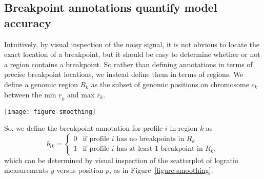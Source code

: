 \documentclass{bioinfo}
\newcommand{\model}[1]{#1}
\newcommand{\NN}{\mathbb N}
\begin{document}
\begin{methods}
\subsection{Breakpoint annotations quantify model accuracy}

Intuitively, by visual inspection of the noisy signal, it is not
obvious to locate the exact location of a breakpoint, but it should be
easy to determine whether or not a region contains a breakpoint.
So rather than defining annotations in terms of precise breakpoint
locations, we instead define them in terms of regions. We define a
genomic region $R_k$ as
the subset of genomic positions on chromosome $c_k$ between the min
$\underline r_k$ and max $\overline r_k$. 

\begin{figure*}
\texttt{[image: figure-smoothing]}
\caption{\label{figure-smoothing}Model agreement to annotated
   regions can be measured by examining the positions of
  predicted breakpoints $\hat B_{i}^\lambda$ (dashed vertical blue
  lines) observed in the smoothing model $\hat y^\lambda$ (solid
  blue lines). 
  Black circles show 
  logratio measurements $y$ plotted against
  position $p$ 
  for a single profile
  $i=375$. Chromosomes are shown in panels from
  left to right, and different values of the smoothing parameter
  $\lambda$ in the \model{flsa} model are shown in panels from top to
  bottom. Models with too many breakpoints ($\lambda=0.5$) and too few
  breakpoints ($\lambda=10$) are suboptimal, so we pick an
  intermediate model ($\lambda=7.5$) that maximizes agreement with
  the annotations, thus detecting a new breakpoint on chromosome 7
  which was not annotated.}
\end{figure*}

So, we define the breakpoint annotation for profile $i$ in region
$k$ as
\begin{equation}
  \label{eq:bik}
  b_{ik}=
  \begin{cases}
    0 & \text{if profile $i$ has no breakpoints in $R_k$}\\
    1 & \text{if profile $i$ has at least 1 breakpoint in $R_k$},
  \end{cases}
\end{equation}
which can be determined by visual inspection of the scatterplot of
logratio measurements $y$ versus position $p$, as in
Figure~\ref{figure-smoothing}.


\end{methods}
\end{document}
